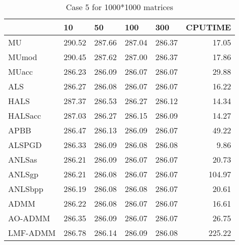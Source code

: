 \documentclass{article}
\begin{document}
\begin{table}[H]
		\caption{Case 5 for 1000*1000 matrices}
	\centering
	\begin{tabular}{|l|r|r|r|r|r|}
		\hline
		& \multicolumn{1}{l|}{10} & \multicolumn{1}{l|}{50} & \multicolumn{1}{l|}{100} & \multicolumn{1}{l|}{300} & \multicolumn{1}{l|}{CPUTIME} \\ \hline
		MU       & 290.52                  & 287.66                  & 287.04                   & 286.37                   & 17.05                        \\ \hline
		MUmod    & 290.45                  & 287.62                  & 287.00                   & 286.37                   & 17.86                        \\ \hline
		MUacc    & 286.23                  & 286.09                  & 286.07                   & 286.07                   & 29.88                        \\ \hline
		ALS      & 286.27                  & 286.08                  & 286.07                   & 286.07                   & 16.22                        \\ \hline
		HALS     & 287.37                  & 286.53                  & 286.27                   & 286.12                   & 14.34                        \\ \hline
		HALSacc  & 287.03                  & 286.27                  & 286.15                   & 286.09                   & 14.27                        \\ \hline
		APBB     & 286.47                  & 286.13                  & 286.09                   & 286.07                   & 49.22                        \\ \hline
		ALSPGD   & 286.33                  & 286.09                  & 286.08                   & 286.08                   & 9.86                         \\ \hline
		ANLSas   & 286.21                  & 286.09                  & 286.07                   & 286.07                   & 20.73                        \\ \hline
		ANLSgp   & 286.21                  & 286.08                  & 286.07                   & 286.07                   & 104.97                       \\ \hline
		ANLSbpp  & 286.19                  & 286.08                  & 286.08                   & 286.07                   & 20.61                        \\ \hline
		ADMM     & 286.22                  & 286.08                  & 286.07                   & 286.07                   & 16.61                        \\ \hline
		AO-ADMM  & 286.35                  & 286.09                  & 286.07                   & 286.07                   & 26.75                        \\ \hline
		LMF-ADMM & 286.78                  & 286.14                  & 286.09                   & 286.08                   & 225.22                       \\ \hline
	\end{tabular}
\end{table}
\end{document}
